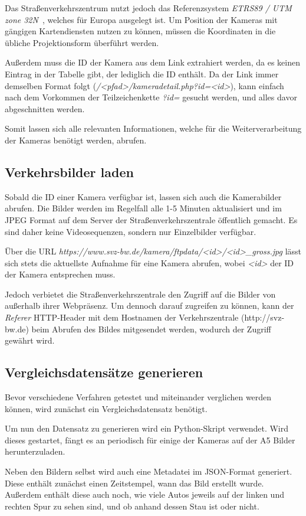Das Straßenverkehrszentrum nutzt jedoch das Referenzsystem {\em ETRS89 / UTM zone 32N}~\cite{etrs89}, welches für Europa ausgelegt ist.
Um Position der Kameras mit gängigen Kartendiensten nutzen zu können, müssen die Koordinaten in die übliche Projektionsform überführt werden.

Außerdem muss die ID der Kamera aus dem Link extrahiert werden, da es keinen Eintrag in der Tabelle gibt, der lediglich die ID enthält.
Da der Link immer demselben Format folgt ({\em /<pfad>/kameradetail.php?id=<id>}), kann einfach nach dem Vorkommen der Teilzeichenkette {\em ?id=} gesucht werden, und alles davor abgeschnitten werden.

Somit lassen sich alle relevanten Informationen, welche für die Weiterverarbeitung der Kameras benötigt werden, abrufen.

\subsection{Verkehrsbilder laden}
Sobald die ID einer Kamera verfügbar ist, lassen sich auch die Kamerabilder abrufen.
Die Bilder werden im Regelfall alle 1-5 Minuten aktualisiert und im JPEG Format auf dem Server der Straßenverkehrszentrale öffentlich gemacht.
Es sind daher keine Videosequenzen, sondern nur Einzelbilder verfügbar.

Über die URL {\em https://www.svz-bw.de/kamera/ftpdata/<id>/<id>\_gross.jpg} lässt sich stets die aktuellste Aufnahme für eine Kamera abrufen, wobei {\em <id>} der ID der Kamera entsprechen muss.

Jedoch verbietet die Straßenverkehrszentrale den Zugriff auf die Bilder von außerhalb ihrer Webpräsenz.
Um dennoch darauf zugreifen zu können, kann der {\em Referer} HTTP-Header mit dem Hostnamen der Verkehrszentrale (http://svz-bw.de) beim Abrufen des Bildes mitgesendet werden, wodurch der Zugriff gewährt wird. 

\subsection{Vergleichsdatensätze generieren}
Bevor verschiedene Verfahren getestet und miteinander verglichen werden können, wird zunächst ein Vergleichsdatensatz benötigt.

Um nun den Datensatz zu generieren wird ein Python-Skript verwendet.
Wird dieses gestartet, fängt es an periodisch für einige der Kameras auf der A5 Bilder herunterzuladen.

Neben den Bildern selbst wird auch eine Metadatei im JSON-Format generiert.
Diese enthält zunächst einen Zeitstempel, wann das Bild erstellt wurde.
Außerdem enthält diese auch noch, wie viele Autos jeweils auf der linken und rechten Spur zu sehen sind, und ob anhand dessen Stau ist oder nicht.

